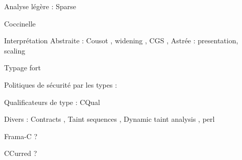 Analyse légère : Sparse 

Coccinelle \cite{coccinelle09} \cite{coccinelle11} 

Interprétation Abstraite : Cousot \cite{Cousot77,Cousot92-1},
    widening \cite{granger},
    CGS \cite{cgs},
    Astrée : presentation\cite{Astree04,Astree05}, scaling \cite{AstreeScale}

Typage fort \cite{TAPL}

Politiques de sécurité par les types : \cite{lightweight-static-capabilities,LZ06a}

Qualificateurs de type : CQual \cite{pldi99,usenix01,pldi02,cquk-usenix04,toplas-quals}

Divers : Contracts \cite{cssv}, Taint sequences \cite{mdv10}, Dynamic taint analysis \cite{oakland10}, perl

Frama-C ?

CCurred ?
